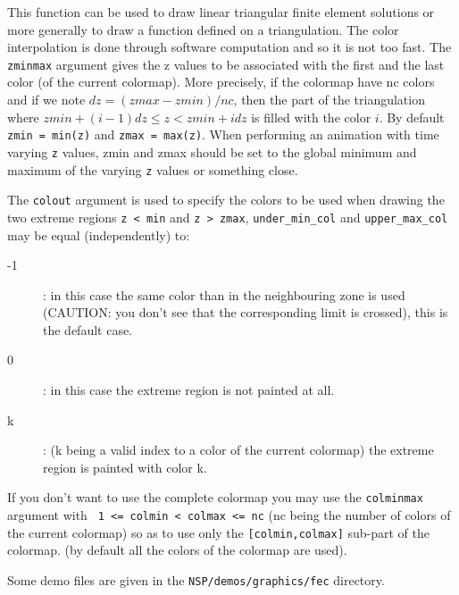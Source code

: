 \begin{mandescription}
  This function can be used to draw linear triangular finite element solutions
  or more generally to draw a function defined on a triangulation. The color interpolation
  is done through software computation and so it is not too fast.
  The \verb!zminmax! argument gives the z values to be associated with the first and the last
  color (of the current colormap). More precisely, if the colormap have nc colors and if we note
  $dz = (zmax-zmin)/nc$, then the part of the triangulation where
  $zmin + (i-1)dz \le z < zmin + i dz$ is filled with the color $i$.
  By default \verb!zmin = min(z)! and \verb!zmax = max(z)!. When performing
  an animation with time varying \verb!z! values, zmin and zmax should be set to
  the global minimum and maximum of the varying \verb!z! values or something close.

  The \verb!colout! argument is used to specify the colors to be used when drawing the
  two extreme regions \verb!z < min! and \verb!z > zmax!, \verb!under_min_col! and
  \verb!upper_max_col! may be equal (independently) to:
  \begin{description}
  \item[-1]: in this case the same color than in the neighbouring zone is used (CAUTION:
    you don't see that the corresponding limit is crossed), this is the default case.
  \item[0]: in this case the extreme region is not painted at all.
  \item[k]: (k being a valid index to a color of the current colormap) the extreme region
    is painted with color k.
  \end{description}
  If you don't want to use the complete colormap you may use the \verb!colminmax!
  argument with \verb! 1 <= colmin < colmax <= nc! (nc being the number of colors
  of the current colormap) so as to use only the \verb![colmin,colmax]!  sub-part of the colormap.
  (by default all the colors of the colormap are used).

  Some demo files are given in the \verb!NSP/demos/graphics/fec! directory.
\end{mandescription}

